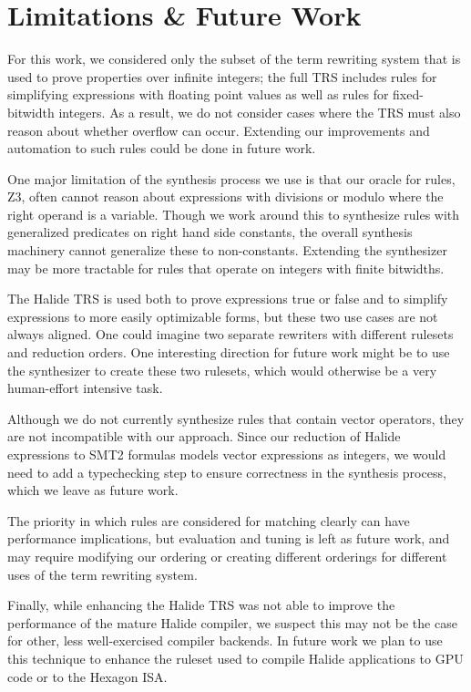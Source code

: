 \documentclass[acmsmall,review]{acmart}\settopmatter{printfolios=true,printccs=false,printacmref=false}
\begin{document}
\section{Limitations \& Future Work}
\label{sec:limitations}
For this work, we considered only the subset of the term rewriting system that
is used to prove properties over infinite integers; the full TRS includes rules
for simplifying expressions with floating point values as well as rules for
fixed-bitwidth integers.  As a result, we do not consider cases where the TRS
must also reason about whether overflow can occur.  Extending our improvements
and automation to such rules could be done in future work.

One major limitation of the synthesis process we use is that our oracle
for rules, Z3, often cannot reason about expressions with divisions or modulo
where the right operand is a variable.  Though we work around this to
synthesize rules with generalized predicates on right hand side constants,
the overall synthesis machinery cannot generalize these to non-constants.
Extending the synthesizer may be more tractable for rules that operate
on integers with finite bitwidths.

The Halide TRS is used both to prove expressions true or false and to
simplify expressions to more easily optimizable forms, but these two use cases
are not always aligned. One could imagine two separate rewriters with
different rulesets and reduction orders. One interesting direction for future
work might be to use the synthesizer to create these two rulesets, which would
otherwise be a very human-effort intensive task.

Although we do not currently synthesize rules that contain vector operators,
they are not incompatible with our approach. Since our reduction of Halide
expressions to SMT2 formulas models vector expressions as integers, we would need
to add a typechecking step to ensure correctness in the synthesis process, which
we leave as future work.

The priority in which rules are considered for matching clearly can have
performance implications, but evaluation and tuning is left as future work, and
may require modifying our ordering or creating different orderings for different
uses of the term rewriting system.

Finally, while enhancing the Halide TRS was not able to improve the performance of the mature Halide compiler, we suspect this may not be the case for other, less well-exercised compiler backends. In future work we plan to use this technique to enhance the ruleset used to compile Halide applications to GPU code or to the Hexagon ISA.
\end{document}
